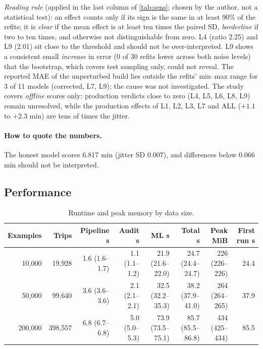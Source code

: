\documentclass[11pt,a4paper]{article}
\begin{document}
\emph{Reading rule} (applied in the last column of \autoref{tab:sens}; chosen by the author, not a statistical test): an effect counts only if its sign is the same in at least 90\% of the refits; it is \emph{clear} if the mean effect is at least ten times the paired SD, \emph{borderline} if two to ten times, and otherwise not distinguishable from zero. L4 (ratio 2.25) and L9 (2.01) sit close to the threshold and should not be over-interpreted. L9 shows a consistent small \emph{increase} in error (0 of 30 refits lower across both noise levels) that the bootstrap, which covers test sampling only, could not reveal. The reported MAE of the unperturbed build lies outside the refits' min--max range for 3 of 11 models (corrected, L7, L9); the cause was not investigated. The study covers \emph{offline} scores only: production verdicts close to zero (L4, L5, L6, L8, L9) remain unresolved, while the production effects of L1, L2, L3, L7 and ALL ($+1.1$ to $+2.3$ min) are tens of times the jitter.

\paragraph{How to quote the numbers.} The honest model scores 6.817 min (jitter SD 0.007), and differences below 0.066 min should not be interpreted.

\subsection{Performance}
\begin{table}[H]
\centering\scriptsize\setlength{\tabcolsep}{3pt}
\caption{Runtime and peak memory by data size.}
\label{tab:bench}
\begin{tabular}{@{}r r r r r r r r@{}}
\toprule
Examples & Trips & Pipeline s & Audit s & ML s & Total s & Peak MiB & First run s \\
\midrule
10{,}000 & 19{,}928 & 1.6 (1.6--1.7) & 1.1 (1.1--1.2) & 21.9 (21.6--22.0) & 24.7 (24.4--24.7) & 226 (226--226) & 24.4 \\
50{,}000 & 99{,}640 & 3.6 (3.6--3.6) & 2.1 (2.1--2.1) & 32.5 (32.2--35.3) & 38.2 (37.9--41.0) & 264 (264--265) & 37.9 \\
200{,}000 & 398{,}557 & 6.8 (6.7--6.8) & 5.0 (5.0--5.3) & 73.9 (73.5--75.1) & 85.7 (85.5--86.8) & 434 (425--434) & 85.5 \\
\bottomrule
\end{tabular}
\end{table}
\end{document}
